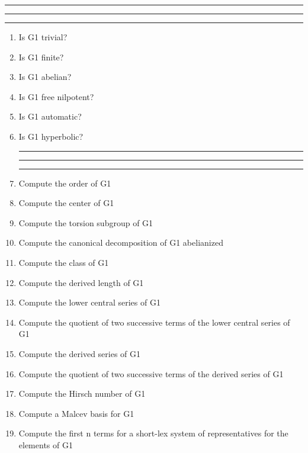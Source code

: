 
\bigskip
\hrule\hrule\hrule

\begin{enumerate}

\item Is G1 trivial?

\item Is G1 finite?

\item Is G1 abelian?

\item Is G1 free nilpotent?

\item Is G1 automatic?

\item Is G1 hyperbolic?

\bigskip
\hrule\hrule\hrule

\item Compute the order of G1

\item Compute the center of G1

\item Compute the torsion subgroup of G1

\item Compute the canonical decomposition of G1 abelianized

\item Compute the class of G1

\item Compute the derived length of G1

\item Compute the lower central series of G1

\item Compute the quotient of two successive terms of the lower central
series of G1

\item Compute the derived series of G1

\item Compute the quotient of two successive terms of the derived series
of G1

\item Compute the Hirsch number of G1

\item Compute a Malcev basis for G1

\item Compute the first n terms for a short-lex system of representatives for the
elements of G1


\end{enumerate}
